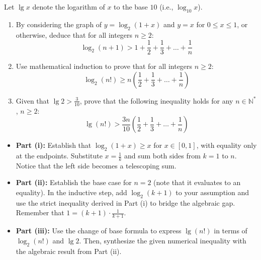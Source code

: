 \begin{problem}
Let $\lg x$ denote the logarithm of $x$ to the base $10$ (i.e., $\log_{10} x$).
\begin{enumerate}[label=(\roman*)]
    \item By considering the graph of $y = \log_2(1+x)$ and $y = x$ for $0 \le x \le 1$, or otherwise, deduce that for all integers $n \ge 2$:
    \[ \log_2(n+1) > 1 + \frac{1}{2} + \frac{1}{3} + \dots + \frac{1}{n} \]
    \item Use mathematical induction to prove that for all integers $n \ge 2$:
    \[ \log_2(n!) \ge n \left( \frac{1}{2} + \frac{1}{3} + \dots + \frac{1}{n} \right) \]
    \item Given that $\lg 2 > \frac{3}{10}$, prove that the following inequality holds for any $n \in \mathbb{N}^*$, $n \ge 2$:
    \[ \lg(n!) > \frac{3n}{10} \left( \frac{1}{2} + \frac{1}{3} + \dots + \frac{1}{n} \right) \]
\end{enumerate}
\end{problem}

\begin{hint}
\begin{itemize}
    \item \textbf{Part (i):} Establish that $\log_2(1+x) \ge x$ for $x \in [0, 1]$, with equality only at the endpoints. Substitute $x = \frac{1}{k}$ and sum both sides from $k=1$ to $n$. Notice that the left side becomes a telescoping sum.
    \item \textbf{Part (ii):} Establish the base case for $n=2$ (note that it evaluates to an equality). In the inductive step, add $\log_2(k+1)$ to your assumption and use the strict inequality derived in Part (i) to bridge the algebraic gap. Remember that $1 = (k+1) \cdot \frac{1}{k+1}$.
    \item \textbf{Part (iii):} Use the change of base formula to express $\lg(n!)$ in terms of $\log_2(n!)$ and $\lg 2$. Then, synthesize the given numerical inequality with the algebraic result from Part (ii).
\end{itemize}
\end{hint}

